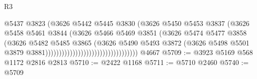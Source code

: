 \begin{lexlean}{R3}
\begin{coremodule}
                                                        @5437
                                                        @3823
                                                        (@3626
                                                          @5442
                                                          @5445
                                                          @3830
                                                          (@3626
                                                            @5450
                                                            @5453
                                                            @3837
                                                            (@3626
                                                              @5458
                                                              @5461
                                                              @3844
                                                              (@3626
                                                                @5466
                                                                @5469
                                                                @3851
                                                                (@3626
                                                                  @5474
                                                                  @5477
                                                                  @3858
                                                                  (@3626
                                                                    @5482
                                                                    @5485
                                                                    @3865
                                                                    (@3626
                                                                      @5490
                                                                      @5493
                                                                      @3872
                                                                      (@3626
                                                                        @5498
                                                                        @5501
                                                                        @3879
                                                                        @3881))))))))))))))))))))))))))))))))))
    @4667
@5709 := @3923 @5169 @568 @1172 @2816 @2813
@5710 := @2422 @1168
@5711 := @5710 @2460
@5740 := @5709

\end{coremodule}
\end{lexlean}
